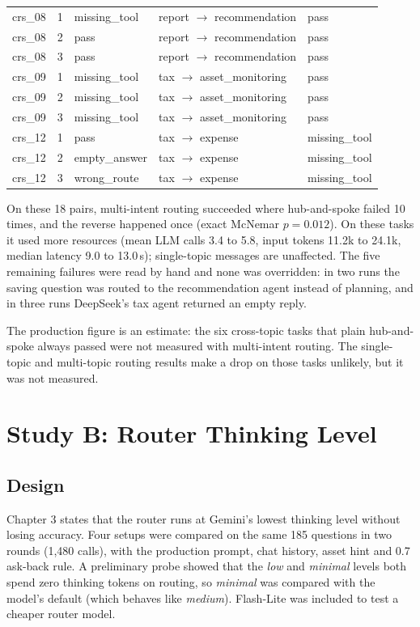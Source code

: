 \documentclass[11pt,a4paper]{article}
\begin{document}
\begin{table}[H]
\begin{tabular}{lrlll}
crs\_\allowbreak{}08 & 1 & missing\_\allowbreak{}tool & report $\rightarrow$ recommendation & pass \\
crs\_\allowbreak{}08 & 2 & pass & report $\rightarrow$ recommendation & pass \\
crs\_\allowbreak{}08 & 3 & pass & report $\rightarrow$ recommendation & pass \\
crs\_\allowbreak{}09 & 1 & missing\_\allowbreak{}tool & tax $\rightarrow$ asset\_\allowbreak{}monitoring & pass \\
crs\_\allowbreak{}09 & 2 & missing\_\allowbreak{}tool & tax $\rightarrow$ asset\_\allowbreak{}monitoring & pass \\
crs\_\allowbreak{}09 & 3 & missing\_\allowbreak{}tool & tax $\rightarrow$ asset\_\allowbreak{}monitoring & pass \\
crs\_\allowbreak{}12 & 1 & pass & tax $\rightarrow$ expense & missing\_\allowbreak{}tool \\
crs\_\allowbreak{}12 & 2 & empty\_\allowbreak{}answer & tax $\rightarrow$ expense & missing\_\allowbreak{}tool \\
crs\_\allowbreak{}12 & 3 & wrong\_\allowbreak{}route & tax $\rightarrow$ expense & missing\_\allowbreak{}tool \\
\bottomrule
\end{tabular}
\end{table}


On these 18 pairs, multi-intent routing succeeded where hub-and-spoke failed 10 times, and the reverse happened once (exact McNemar $p=0.012$). On these tasks it used more resources (mean LLM calls 3.4 to 5.8, input tokens 11.2k to 24.1k, median latency 9.0 to 13.0\,s); single-topic messages are unaffected. The five remaining failures were read by hand and none was overridden: in two runs the saving question was routed to the recommendation agent instead of planning, and in three runs DeepSeek's tax agent returned an empty reply.

The production figure is an estimate: the six cross-topic tasks that plain hub-and-spoke always passed were not measured with multi-intent routing. The single-topic and multi-topic routing results make a drop on those tasks unlikely, but it was not measured.

\section{Study B: Router Thinking Level}

\subsection{Design}
Chapter 3 states that the router runs at Gemini's lowest thinking level without losing accuracy. Four setups were compared on the same 185 questions in two rounds (1,480 calls), with the production prompt, chat history, asset hint and 0.7 ask-back rule. A preliminary probe showed that the \emph{low} and \emph{minimal} levels both spend zero thinking tokens on routing, so \emph{minimal} was compared with the model's default (which behaves like \emph{medium}). Flash-Lite was included to test a cheaper router model.
\end{document}
